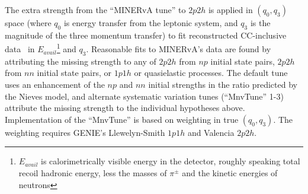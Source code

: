 The extra strength from the ``MINERvA tune'' to $2p2h$ is applied in $(q_0,q_3)$ space (where $q_0$ is energy transfer from the leptonic system, and $q_3$ is the magnitude of the three momentum transfer) to fit reconstructed \minerva CC-inclusive data~\cite{Rodrigues:2015hik} in $E_{avail}$\footnote{$E_{avail}$ is calorimetrically visible energy in the detector, roughly speaking total recoil hadronic energy, less the masses of $\pi^\pm$ and the kinetic energies of neutrons} and $q_3$.  Reasonable fits to MINERvA's data are found by attributing the missing strength to any of $2p2h$ from $np$ initial state pairs, $2p2h$ from $nn$ initial state pairs, or $1p1h$ or quasielastic processes.  The default tune uses an enhancement of the $np$ and $nn$ initial strengths in the ratio predicted by the Nieves model, and alternate systematic variation tunes (``MnvTune'' 1-3) attribute the missing strength to the individual hypotheses above. Implementation of the ``MnvTune'' is based on weighting in true $(q_0,q_3)$. The weighting requires GENIE's Llewelyn-Smith $1p1h$ and Valencia $2p2h$.



